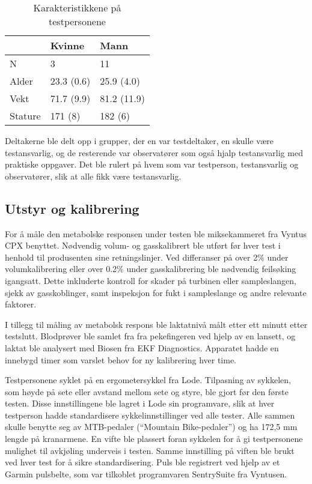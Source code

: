 \documentclass[
  letterpaper,
  DIV=11,
  numbers=noendperiod]{scrreprt}
\begin{document}
\begin{longtable}[]{@{}lll@{}}

\caption{\label{tbl-testantro}Karakteristikkene på testpersonene}

\tabularnewline

\toprule\noalign{}
& Kvinne & Mann \\
\midrule\noalign{}
\endhead
\bottomrule\noalign{}
\endlastfoot
N & 3 & 11 \\
Alder & 23.3 (0.6) & 25.9 (4.0) \\
Vekt & 71.7 (9.9) & 81.2 (11.9) \\
Stature & 171 (8) & 182 (6) \\

\end{longtable}

Deltakerne ble delt opp i grupper, der en var testdeltaker, en skulle
være testansvarlig, og de resterende var observatører som også hjalp
testansvarlig med praktiske oppgaver. Det ble rulert på hvem som var
testperson, testansvarlig og observatører, slik at alle fikk være
testansvarlig.

\subsection{Utstyr og kalibrering}\label{utstyr-og-kalibrering}

For å måle den metabolske responsen under testen ble miksekammeret fra
Vyntus CPX benyttet. Nødvendig volum- og gasskalibrert ble utført før
hver test i henhold til produsenten sine retningslinjer. Ved differanser
på over 2\% under volumkalibrering eller over 0.2\% under
gasskalibrering ble nødvendig feilsøking igangsatt. Dette inkluderte
kontroll for skader på turbinen eller sampleslangen, sjekk av
gasskoblinger, samt inspeksjon for fukt i sampleslange og andre
relevante faktorer.

I tillegg til måling av metabolsk respons ble laktatnivå målt etter ett
minutt etter testslutt. Blodprøver ble samlet fra fra pekefingeren ved
hjelp av en lansett, og laktat ble analysert med Biosen fra EKF
Diagnostics. Apparatet hadde en innebygd timer som varslet behov for ny
kalibrering hver time.

Testpersonene syklet på en ergometersykkel fra Lode. Tilpasning av
sykkelen, som høyde på sete eller avstand mellom sete og styre, ble
gjort før den første testen. Disse innstillingene ble lagret i Lode sin
programvare, slik at hver testperson hadde standardisere
sykkelinnstillinger ved alle tester. Alle sammen skulle benytte seg av
MTB-pedaler (``Mountain Bike-pedaler'') og ha 172,5 mm lengde på
kranarmene. En vifte ble plassert foran sykkelen for å gi testpersonene
mulighet til avkjøling underveis i testen. Samme innstilling på viften
ble brukt ved hver test for å sikre standardisering. Puls ble registrert
ved hjelp av et Garmin pulsbelte, som var tilkoblet programvaren
SentrySuite fra Vyntusen.
\end{document}
